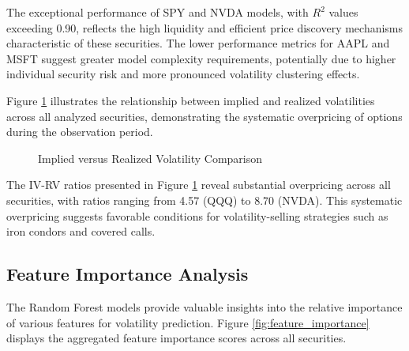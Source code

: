 \documentclass[12pt,a4paper]{article}
\begin{document}
The exceptional performance of SPY and NVDA models, with $R^2$ values exceeding 0.90, reflects the high liquidity and efficient price discovery mechanisms characteristic of these securities. The lower performance metrics for AAPL and MSFT suggest greater model complexity requirements, potentially due to higher individual security risk and more pronounced volatility clustering effects.

Figure \ref{fig:iv_rv_comparison} illustrates the relationship between implied and realized volatilities across all analyzed securities, demonstrating the systematic overpricing of options during the observation period.

\begin{figure}[H]
\centering
{}
\caption{Implied versus Realized Volatility Comparison}
\label{fig:iv_rv_comparison}
\end{figure}

The IV-RV ratios presented in Figure \ref{fig:iv_rv_comparison} reveal substantial overpricing across all securities, with ratios ranging from 4.57 (QQQ) to 8.70 (NVDA). This systematic overpricing suggests favorable conditions for volatility-selling strategies such as iron condors and covered calls.

\subsection{Feature Importance Analysis}

The Random Forest models provide valuable insights into the relative importance of various features for volatility prediction. Figure \ref{fig:feature_importance} displays the aggregated feature importance scores across all securities.
\end{document}
